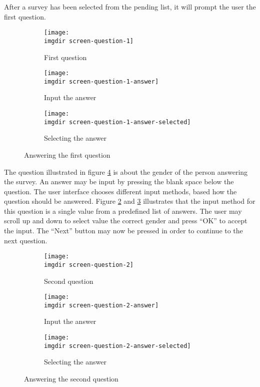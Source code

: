 After a survey has been selected from the pending list, it will prompt the user the first question.

\begin{figure}[!htbp]
  \centering
  \begin{subfigure}{.3\textwidth}
    \centering
    \texttt{[image: \\imgdir screen-question-1]}
    \caption{First question}
    \label{fig:screen-question-1}
  \end{subfigure}
  \begin{subfigure}{.3\textwidth}
    \centering
    \texttt{[image: \\imgdir screen-question-1-answer]}
    \caption{Input the answer}
    \label{fig:screen-question-1-answer}
  \end{subfigure}
    \begin{subfigure}{.3\textwidth}
    \centering
    \texttt{[image: \\imgdir screen-question-1-answer-selected]}
    \caption{Selecting the answer}
    \label{fig:screen-question-1-answer-selected}
  \end{subfigure}
  \caption{Answering the first question}
  \label{fig:screen-first-question}
\end{figure}

The question illustrated in figure \ref{fig:screen-first-question} is about the gender of the person answering the survey. An answer may be input by pressing the blank space below the question. The user interface chooses different input methods, based how the question should be answered. Figure \ref{fig:screen-question-1-answer} and \ref{fig:screen-question-1-answer-selected} illustrates that the input method for this question is a single value from a predefined list of answers. The user may scroll up and down to select value the correct gender and press ``OK'' to accept the input. The ``Next'' button may now be pressed in order to continue to the next question.

\begin{figure}[!htbp]
  \centering
  \begin{subfigure}{.3\textwidth}
    \centering
    \texttt{[image: \\imgdir screen-question-2]}
    \caption{Second question}
    \label{fig:screen-question-2}
  \end{subfigure}
  \begin{subfigure}{.3\textwidth}
    \centering
    \texttt{[image: \\imgdir screen-question-2-answer]}
    \caption{Input the answer}
    \label{fig:screen-question-2-answer}
  \end{subfigure}
  \begin{subfigure}{.3\textwidth}
    \centering
    \texttt{[image: \\imgdir screen-question-2-answer-selected]}
    \caption{Selecting the answer}
    \label{fig:screen-question-2-answer-selected}
  \end{subfigure}
  \caption{Answering the second question}
  \label{fig:screen-second-question}
\end{figure}

